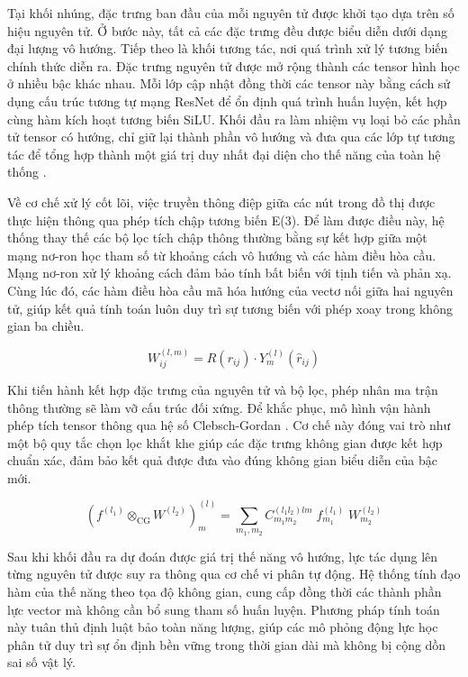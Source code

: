 Tại khối nhúng, đặc trưng ban đầu của mỗi nguyên tử được khởi tạo dựa trên số hiệu nguyên tử. Ở bước này, tất cả các đặc trưng đều được biểu diễn dưới dạng đại lượng vô hướng. Tiếp theo là khối tương tác, nơi quá trình xử lý tương biến chính thức diễn ra. Đặc trưng nguyên tử được mở rộng thành các tensor hình học ở nhiều bậc khác nhau. Mỗi lớp cập nhật đồng thời các tensor này bằng cách sử dụng cấu trúc tương tự mạng ResNet để ổn định quá trình huấn luyện, kết hợp cùng hàm kích hoạt tương biến SiLU. Khối đầu ra làm nhiệm vụ loại bỏ các phần tử tensor có hướng, chỉ giữ lại thành phần vô hướng và đưa qua các lớp tự tương tác để tổng hợp thành một giá trị duy nhất đại diện cho thế năng của toàn hệ thống \cite{batzner2022nequip}.

Về cơ chế xử lý cốt lõi, việc truyền thông điệp giữa các nút trong đồ thị được thực hiện thông qua phép tích chập tương biến E(3). Để làm được điều này, hệ thống thay thế các bộ lọc tích chập thông thường bằng sự kết hợp giữa một mạng nơ-ron học tham số từ khoảng cách vô hướng và các hàm điều hòa cầu. Mạng nơ-ron xử lý khoảng cách đảm bảo tính bất biến với tịnh tiến và phản xạ. Cùng lúc đó, các hàm điều hòa cầu mã hóa hướng của vectơ nối giữa hai nguyên tử, giúp kết quả tính toán luôn duy trì sự tương biến với phép xoay trong không gian ba chiều.

\begin{equation}
    W_{ij}^{(l,m)} = R\!\left(r_{ij}\right) \cdot Y_m^{(l)}\!\left(\hat{r}_{ij}\right)
    \label{eq:nequip-filter}
\end{equation}

Khi tiến hành kết hợp đặc trưng của nguyên tử và bộ lọc, phép nhân ma trận thông thường sẽ làm vỡ cấu trúc đối xứng. Để khắc phục, mô hình vận hành phép tích tensor thông qua hệ số Clebsch-Gordan \cite{batzner2022nequip}. Cơ chế này đóng vai trò như một bộ quy tắc chọn lọc khắt khe giúp các đặc trưng không gian được kết hợp chuẩn xác, đảm bảo kết quả được đưa vào đúng không gian biểu diễn của bậc mới.

\begin{equation}
    \left(f^{(l_1)} \otimes_{\text{CG}} W^{(l_2)}\right)_m^{(l)}
    = \sum_{m_1, m_2} C_{m_1 m_2}^{(l_1 l_2) lm}\; f_{m_1}^{(l_1)}\; W_{m_2}^{(l_2)}
    \label{eq:clebsch-gordan}
\end{equation}

Sau khi khối đầu ra dự đoán được giá trị thế năng vô hướng, lực tác dụng lên từng nguyên tử được suy ra thông qua cơ chế vi phân tự động. Hệ thống tính đạo hàm của thế năng theo tọa độ không gian, cung cấp đồng thời các thành phần lực vector mà không cần bổ sung tham số huấn luyện. Phương pháp tính toán này tuân thủ định luật bảo toàn năng lượng, giúp các mô phỏng động lực học phân tử duy trì sự ổn định bền vững trong thời gian dài mà không bị cộng dồn sai số vật lý.

